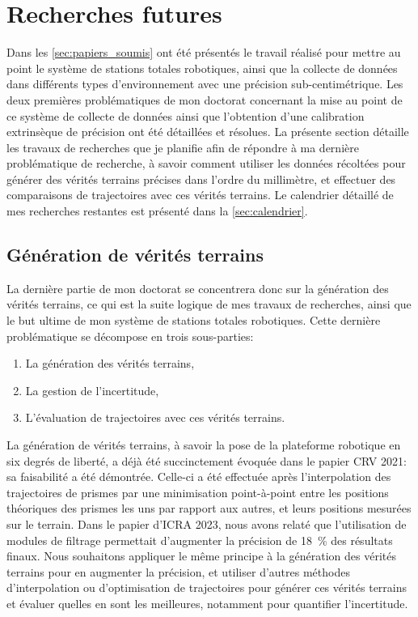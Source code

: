 \section{Recherches futures}
\label{sec:recherches_futures}

Dans les \autoref{sec:papiers_soumis} ont été présentés le travail réalisé pour mettre au point le système de stations totales robotiques, ainsi que la collecte de données dans différents types d'environnement avec une précision sub-centimétrique.
Les deux premières problématiques de mon doctorat concernant la mise au point de ce système de collecte de données ainsi que l'obtention d'une calibration extrinsèque de précision ont été détaillées et résolues.
La présente section détaille les travaux de recherches que je planifie afin de répondre à ma dernière problématique de recherche, à savoir comment utiliser les données récoltées pour générer des vérités terrains précises dans l'ordre du millimètre, et effectuer des comparaisons de trajectoires avec ces vérités terrains.
Le calendrier détaillé de mes recherches restantes est présenté dans la \autoref{sec:calendrier}.

\subsection{Génération de vérités terrains}

La dernière partie de mon doctorat se concentrera donc sur la génération des vérités terrains, ce qui est la suite logique de mes travaux de recherches, ainsi que le but ultime de mon système de stations totales robotiques.
Cette dernière problématique se décompose en trois sous-parties:

\begin{enumerate}\bfseries
    \item La génération des vérités terrains,
    \item La gestion de l'incertitude,
    \item L'évaluation de trajectoires avec ces vérités terrains.
\end{enumerate}

La génération de vérités terrains, à savoir la pose de la plateforme robotique en six degrés de liberté, a déjà été succinctement évoquée dans le papier CRV 2021: sa faisabilité a été démontrée.
Celle-ci a été effectuée après l'interpolation des trajectoires de prismes par une minimisation point-à-point entre les positions théoriques des prismes les uns par rapport aux autres, et leurs positions mesurées sur le terrain.
Dans le papier d'ICRA 2023, nous avons relaté que l'utilisation de modules de filtrage permettait d'augmenter la précision de \SI{18}{\%} des résultats finaux.
Nous souhaitons appliquer le même principe à la génération des vérités terrains pour en augmenter la précision, et utiliser d'autres méthodes d'interpolation ou d'optimisation de trajectoires pour générer ces vérités terrains et évaluer quelles en sont les meilleures, notamment pour quantifier l'incertitude.

